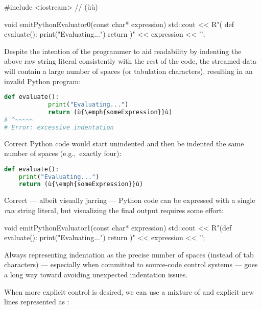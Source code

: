 \begin{emcppshiddenlisting}[emcppsbatch={e2,e3,e4}]
#include <iostream>  // (ù{}ù)
\end{emcppshiddenlisting}
\begin{emcppslisting}[emcppsbatch=e2]
void emitPythonEvaluator0(const char* expression)
{
    std::cout << R"(
        def evaluate():
            print("Evaluating...")
            return )" << expression << '\n';
}
\end{emcppslisting}

\noindent Despite the intention of the programmer to aid readability by indenting
the above raw string literal consistently with the rest of the code, the
streamed data will contain a large number of spaces (or tabulation
characters), resulting in an invalid Python program:

\begin{lstlisting}[language=python]
        def evaluate():
            print("Evaluating...")
            return (ù{\emph{someExpression}}ù)
# ^~~~~~
# Error: excessive indentation
\end{lstlisting}

\noindent Correct Python code would start unindented and then be indented the same number
of spaces (e.g.,~exactly four):

\begin{lstlisting}[language=python]
def evaluate():
    print("Evaluating...")
    return (ù{\emph{someExpression}}ù)
\end{lstlisting}

\noindent Correct --- albeit visually jarring --- Python code can be expressed with a
single \emph{raw} string literal, but visualizing the final output requires some effort:

\begin{emcppslisting}[emcppsbatch=e3]
void emitPythonEvaluator1(const char* expression)
{
    std::cout << R"(def evaluate():
    print("Evaluating...")
    return )" << expression << '\n';
}
\end{emcppslisting}

\noindent Always
representing indentation as the precise number of spaces (instead of
tab characters) --- especially when committed to source-code control
  systems --- goes a long way toward avoiding unexpected indentation issues.

When more explicit control is desired, we can use a mixture of
 and explicit new lines represented as
:

